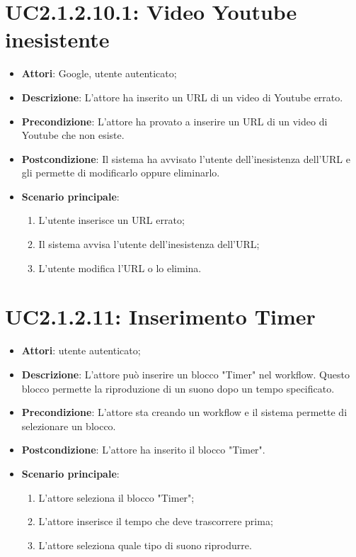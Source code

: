 \section{UC2.1.2.10.1: Video Youtube inesistente}
\label{UC2.1.2.10.1}
\begin{itemize}
	\item \textbf{Attori}: Google, utente autenticato;
	\item \textbf{Descrizione}: L'attore ha inserito un URL di un video di Youtube errato.
	\item \textbf{Precondizione}: L'attore ha provato a inserire un URL di un video di Youtube che non esiste.
	\item \textbf{Postcondizione}: Il sistema ha avvisato l'utente dell'inesistenza dell'URL e gli permette di modificarlo oppure eliminarlo.
	\item \textbf{Scenario principale}:
	\begin{enumerate} \item L'utente inserisce un URL errato;  \item  Il sistema avvisa l'utente dell'inesistenza dell'URL;  \item  L'utente modifica l'URL o lo elimina.\end{enumerate}
\end{itemize}

\section{UC2.1.2.11: Inserimento Timer}
\label{UC2.1.2.11}
\begin{itemize}
	\item \textbf{Attori}: utente autenticato;
	\item \textbf{Descrizione}: L'attore può inserire un blocco "Timer" nel workflow. Questo blocco permette la riproduzione di un suono dopo un tempo specificato.
	\item \textbf{Precondizione}: L'attore sta creando un workflow e il sistema permette di selezionare un blocco.
	\item \textbf{Postcondizione}: L'attore ha inserito il blocco "Timer".
	\item \textbf{Scenario principale}:
	\begin{enumerate} \item L'attore seleziona il blocco "Timer";  \item  L'attore inserisce il tempo che deve trascorrere prima;  \item  L'attore seleziona quale tipo di suono riprodurre.\end{enumerate}
\end{itemize}

